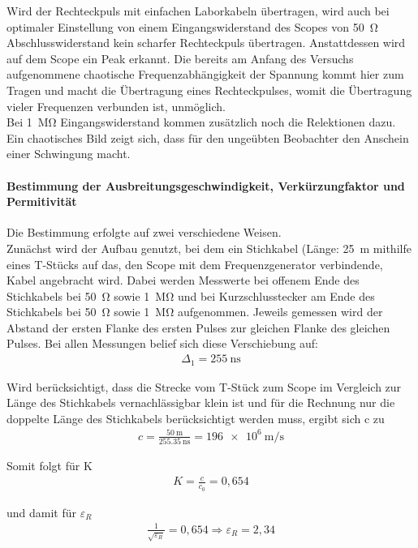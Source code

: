 \documentclass[a4paper,twoside,final]{article}
\begin{document}
Wird der Rechteckpuls mit einfachen Laborkabeln übertragen, wird auch bei optimaler Einstellung von einem Eingangswiderstand des Scopes von \SI{50}{\ohm} Abschlusswiderstand kein scharfer Rechteckpuls übertragen. Anstattdessen wird auf dem Scope ein Peak erkannt. Die bereits am Anfang des Versuchs aufgenommene chaotische Frequenzabhängigkeit der Spannung kommt hier zum Tragen und macht die Übertragung eines Rechteckpulses, womit die Übertragung vieler Frequenzen verbunden ist, unmöglich. \\
Bei \SI{1}{\mega\ohm} Eingangswiderstand kommen zusätzlich noch die Relektionen dazu. Ein chaotisches Bild zeigt sich, dass für den ungeübten Beobachter den Anschein einer Schwingung macht.
\newpage
\paragraph{Bestimmung der Ausbreitungsgeschwindigkeit, Verkürzungfaktor und Permitivität}
Die Bestimmung erfolgte auf zwei verschiedene Weisen. \\
Zunächst wird der Aufbau genutzt, bei dem ein Stichkabel (Länge: \SI{25}{\metre} mithilfe eines T-Stücks auf das, den Scope mit dem Frequenzgenerator verbindende, Kabel angebracht wird. Dabei werden Messwerte bei offenem Ende des Stichkabels bei \SI{50}{\ohm} sowie \SI{1}{\mega\ohm} und bei Kurzschlusstecker am Ende des Stichkabels bei \SI{50}{\ohm} sowie \SI{1}{\mega\ohm} aufgenommen. Jeweils gemessen wird der Abstand der ersten Flanke des ersten Pulses zur gleichen Flanke des gleichen Pulses. Bei allen Messungen belief sich diese Verschiebung auf:
\begin{align}
\Delta_1 = \SI{255}{\nano\second}
\end{align}

Wird berücksichtigt, dass die Strecke vom T-Stück zum Scope im Vergleich zur Länge des Stichkabels vernachlässigbar klein ist und für die Rechnung nur die doppelte Länge des Stichkabels berücksichtigt werden muss, ergibt sich c zu
\begin{align}
c = \frac{\SI{50}{\metre}}{\SI{255,35}{\nano\second}} = \SI{196e6}{\metre\per\second}
\end{align}

Somit folgt für K
\begin{align}
K = \frac{c}{c_0} = 0,654
\end{align}

und damit für $\varepsilon_R$
\begin{align}
\frac{1}{\sqrt{\varepsilon_R}} = 0,654 \Rightarrow \varepsilon_R = 2,34
\end{align}
\end{document}
